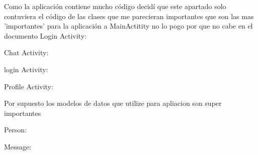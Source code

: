 %
Como la aplicación contiene mucho código decidí que este apartado solo contuviera el código de las clases que me parecieran importantes que son las mas 'importantes' para la aplicación a MainActitity no lo pogo por que no cabe en el documento  
\newpage
Login Activity:

\newpage
Chat Activity:

\newpage
login Activity:

\newpage
Profile Activity:

\newpage
Por supuesto los modelos de datos que utilize para apliacion son super importantes

Person:

\newpage
Message:
